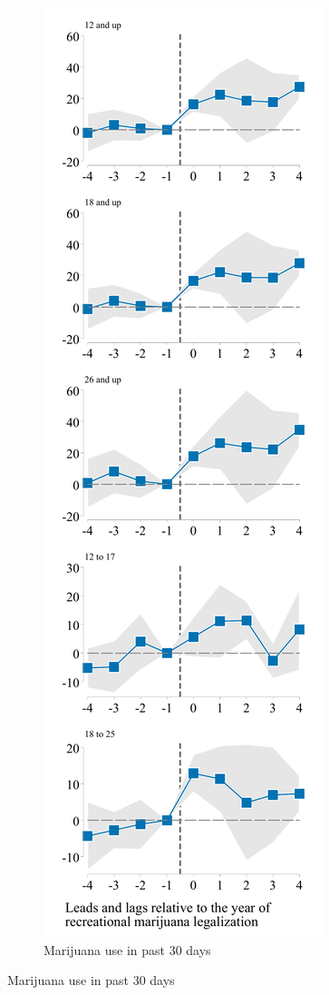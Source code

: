 \documentclass[12pt]{article}%
\begin{document}
\begin{figure}
\begin{minipage}{.9\linewidth}
\begin{subfigure}[b]{0.32\columnwidth}
        \end{subfigure}
            \hfill %
        \begin{subfigure}[b]{0.32\columnwidth}
            \caption{\scriptsize{Marijuana use in past 30 days}}
            \includegraphics[width=\linewidth]{../output/plots/full-balanced-event-study-estimates-ln-mj_use_30.pdf}

\end{subfigure}
\end{minipage}
\end{figure}
\end{document}

